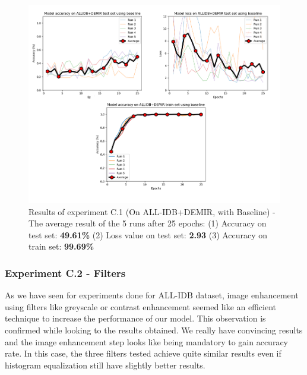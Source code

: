 \documentclass[11pt, openany]{report}
\theoremstyle{plain}
\theoremstyle{definition}
\theoremstyle{remark}
\begin{document}
\begin{figure}[H]
  \centering
  \includegraphics[scale=0.42]{Code/ch6-LeukemiaSubtypes/figures_result/LEUK-SUBTYPES/leukSub-baseline.PNG}
  \caption{Results of experiment C.1 (On ALL-IDB+DEMIR, with Baseline) - The average result of the 5 runs after 25 epochs: (1) Accuracy on test set: \textbf{49.61\%} (2) Loss value on test set: \textbf{2.93} (3) Accuracy on train set: \textbf{99.69\%}}
  \label{fig:results-C1}
\end{figure}


\subsubsection{Experiment C.2 - Filters}

As we have seen for experiments done for ALL-IDB dataset, image enhancement using filters like greyscale or contrast enhancement seemed like an efficient technique to increase the performance of our model. This observation is confirmed while looking to the results obtained. We really have convincing results and the image enhancement step looks like being mandatory to gain accuracy rate. In this case, the three filters tested achieve quite similar results even if histogram equalization still have slightly better results.  
\end{document}
